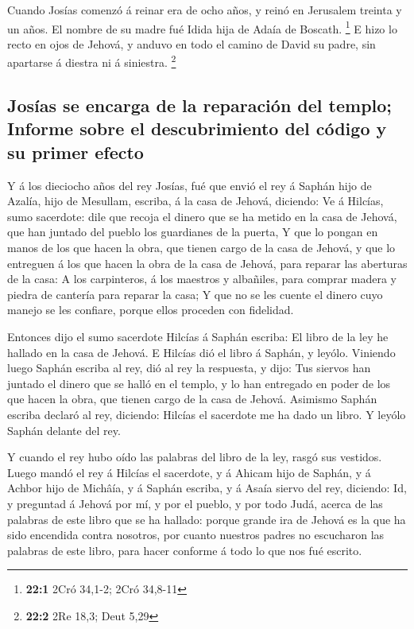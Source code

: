  Cuando Josías comenzó á reinar era de ocho años, y reinó
en Jerusalem treinta y un años. El nombre de su madre fué Idida hija de
Adaía de Boscath. \footnote{\textbf{22:1} 2Cró 34,1-2; 2Cró 34,8-11}
 E hizo lo recto en ojos de Jehová, y anduvo en todo el
camino de David su padre, sin apartarse á diestra ni á siniestra.
\footnote{\textbf{22:2} 2Re 18,3; Deut 5,29}

\hypertarget{josuxedas-se-encarga-de-la-reparaciuxf3n-del-templo-informe-sobre-el-descubrimiento-del-cuxf3digo-y-su-primer-efecto}{%
\subsection{Josías se encarga de la reparación del templo; Informe sobre
el descubrimiento del código y su primer
efecto}\label{josuxedas-se-encarga-de-la-reparaciuxf3n-del-templo-informe-sobre-el-descubrimiento-del-cuxf3digo-y-su-primer-efecto}}

 Y á los dieciocho años del rey Josías, fué que envió el
rey á Saphán hijo de Azalía, hijo de Mesullam, escriba, á la casa de
Jehová, diciendo:  Ve á Hilcías, sumo sacerdote: dile que
recoja el dinero que se ha metido en la casa de Jehová, que han juntado
del pueblo los guardianes de la puerta,  Y que lo pongan
en manos de los que hacen la obra, que tienen cargo de la casa de
Jehová, y que lo entreguen á los que hacen la obra de la casa de Jehová,
para reparar las aberturas de la casa:  A los carpinteros,
á los maestros y albañiles, para comprar madera y piedra de cantería
para reparar la casa;  Y que no se les cuente el dinero
cuyo manejo se les confiare, porque ellos proceden con fidelidad.

 Entonces dijo el sumo sacerdote Hilcías á Saphán escriba:
El libro de la ley he hallado en la casa de Jehová. E Hilcías dió el
libro á Saphán, y leyólo.  Viniendo luego Saphán escriba
al rey, dió al rey la respuesta, y dijo: Tus siervos han juntado el
dinero que se halló en el templo, y lo han entregado en poder de los que
hacen la obra, que tienen cargo de la casa de Jehová. 
Asimismo Saphán escriba declaró al rey, diciendo: Hilcías el sacerdote
me ha dado un libro. Y leyólo Saphán delante del rey.

 Y cuando el rey hubo oído las palabras del libro de la
ley, rasgó sus vestidos.  Luego mandó el rey á Hilcías el
sacerdote, y á Ahicam hijo de Saphán, y á Achbor hijo de Michâía, y á
Saphán escriba, y á Asaía siervo del rey, diciendo:  Id,
y preguntad á Jehová por mí, y por el pueblo, y por todo Judá, acerca de
las palabras de este libro que se ha hallado: porque grande ira de
Jehová es la que ha sido encendida contra nosotros, por cuanto nuestros
padres no escucharon las palabras de este libro, para hacer conforme á
todo lo que nos fué escrito.


